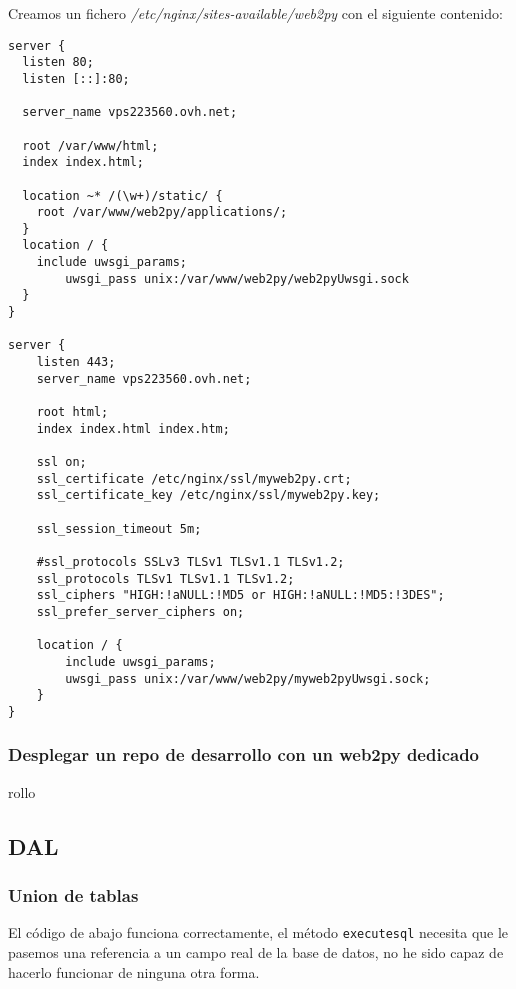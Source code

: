 \documentclass[12pt,spanish,]{article}
\begin{document}
Creamos un fichero \emph{/etc/nginx/sites-available/web2py} con el
siguiente contenido:

\begin{verbatim}
server {
  listen 80;
  listen [::]:80;

  server_name vps223560.ovh.net;

  root /var/www/html;
  index index.html;

  location ~* /(\w+)/static/ {
    root /var/www/web2py/applications/;
  }
  location / {
    include uwsgi_params;
        uwsgi_pass unix:/var/www/web2py/web2pyUwsgi.sock
  }
}

server {
    listen 443;
    server_name vps223560.ovh.net;

    root html;
    index index.html index.htm;

    ssl on;
    ssl_certificate /etc/nginx/ssl/myweb2py.crt;
    ssl_certificate_key /etc/nginx/ssl/myweb2py.key;

    ssl_session_timeout 5m;

    #ssl_protocols SSLv3 TLSv1 TLSv1.1 TLSv1.2;
    ssl_protocols TLSv1 TLSv1.1 TLSv1.2;
    ssl_ciphers "HIGH:!aNULL:!MD5 or HIGH:!aNULL:!MD5:!3DES";
    ssl_prefer_server_ciphers on;

    location / {
        include uwsgi_params;
        uwsgi_pass unix:/var/www/web2py/myweb2pyUwsgi.sock;
    }
}
\end{verbatim}

\subsubsection{Desplegar un repo de desarrollo con un web2py
dedicado}\label{desplegar-un-repo-de-desarrollo-con-un-web2py-dedicado}

rollo

\subsection{DAL}\label{dal}

\subsubsection{Union de tablas}\label{union-de-tablas}

El código de abajo funciona correctamente, el método \texttt{executesql}
necesita que le pasemos una referencia a un campo real de la base de
datos, no he sido capaz de hacerlo funcionar de ninguna otra forma.
\end{document}
